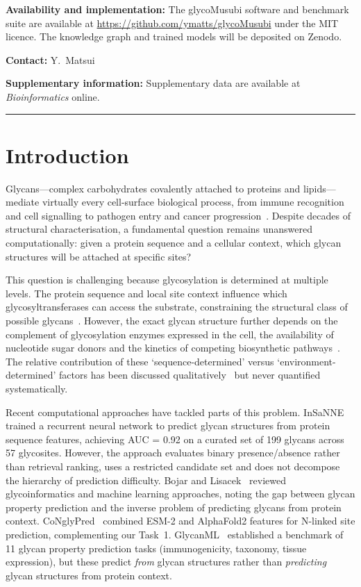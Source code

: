 \documentclass[11pt,a4paper]{article}
\newcommand{\HRule}{\rule{\linewidth}{0.4pt}}
\begin{document}
\textbf{Availability and implementation:}
The glycoMusubi software and benchmark suite are available at
\url{https://github.com/ymatts/glycoMusubi} under the MIT licence.
The knowledge graph and trained models will be deposited on Zenodo.

\textbf{Contact:} Y.\ Matsui

\textbf{Supplementary information:} Supplementary data are available at
\textit{Bioinformatics} online.

\HRule

\section{Introduction}

Glycans---complex carbohydrates covalently attached to proteins and
lipids---mediate virtually every cell-surface biological process, from immune
recognition and cell signalling to pathogen entry and cancer
progression~\cite{varki2017,reily2019}. Despite decades of structural
characterisation, a fundamental question remains unanswered computationally:
given a protein sequence and a cellular context, which glycan structures will
be attached at specific sites?

This question is challenging because glycosylation is determined at multiple
levels. The protein sequence and local site context influence which
glycosyltransferases can access the substrate, constraining the structural
class of possible glycans~\cite{schjoldager2020,narimatsu2019}. However, the
exact glycan structure further depends on the complement of glycosylation
enzymes expressed in the cell, the availability of nucleotide sugar donors and
the kinetics of competing biosynthetic
pathways~\cite{stanley2022,varki2022essentials}. The relative contribution of
these `sequence-determined' versus `environment-determined' factors has been
discussed qualitatively~\cite{schjoldager2020} but never quantified
systematically.

Recent computational approaches have tackled parts of this problem.
InSaNNE~\cite{kellman2024} trained a recurrent neural network to predict glycan
structures from protein sequence features, achieving AUC = 0.92 on a curated set
of 199 glycans across 57 glycosites. However, the approach evaluates binary
presence/absence rather than retrieval ranking, uses a restricted candidate set
and does not decompose the hierarchy of prediction difficulty.
Bojar and Lisacek~\cite{bojar2022} reviewed glycoinformatics and machine learning
approaches, noting the gap between glycan property prediction and the inverse
problem of predicting glycans from protein context.
CoNglyPred~\cite{congly2025} combined ESM-2 and AlphaFold2 features for N-linked
site prediction, complementing our Task~1. GlycanML~\cite{glyml2024} established
a benchmark of 11 glycan property prediction tasks (immunogenicity, taxonomy,
tissue expression), but these predict \textit{from} glycan structures rather than
\textit{predicting} glycan structures from protein context.
\end{document}
